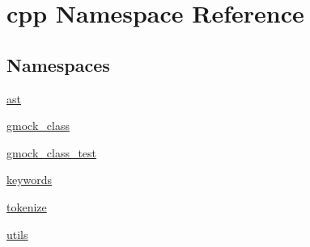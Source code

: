 \hypertarget{namespacecpp}{}\section{cpp Namespace Reference}
\label{namespacecpp}
\subsection*{Namespaces}
\begin{DoxyCompactItemize}
\item 
 \hyperlink{namespacecpp_1_1ast}{ast}
\item 
 \hyperlink{namespacecpp_1_1gmock__class}{gmock\+\_\+class}
\item 
 \hyperlink{namespacecpp_1_1gmock__class__test}{gmock\+\_\+class\+\_\+test}
\item 
 \hyperlink{namespacecpp_1_1keywords}{keywords}
\item 
 \hyperlink{namespacecpp_1_1tokenize}{tokenize}
\item 
 \hyperlink{namespacecpp_1_1utils}{utils}
\end{DoxyCompactItemize}
